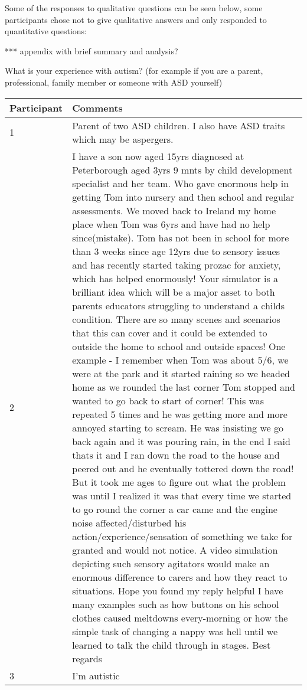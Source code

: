 Some of the responses to qualitative questions can be seen below, some participants chose not to give qualitative answers and only responded to quantitative questions:

*** appendix with brief summary and analysis?

What is your experience with autism? (for example if you are a parent, professional, family member or someone with ASD yourself)
\begin{table}[H]
    \begin{tabular}{| p{3cm} | p{12cm} |}
    \hline
     Participant & Comments \\ \hline
     1 & Parent of two ASD children. I also have ASD traits which may be aspergers. \\ \hline
     2 & I have a son now aged 15yrs diagnosed at Peterborough aged 3yrs 9 mnts by child development specialist and her team. Who gave enormous help in getting Tom into nursery and then school and regular assessments. We moved back to Ireland my home place when Tom was 6yrs and have had no help since(mistake). Tom has not been in school for more than 3 weeks since age 12yrs due to sensory issues and has recently started taking prozac for anxiety, which has helped enormously! Your simulator is a brilliant idea which will be a major asset to both parents educators struggling to understand a childs condition. There are so many scenes and scenarios that this can cover and it could be extended to outside the home to school and outside spaces! One example - I remember when Tom was about 5/6, we were at the park and it started raining so we headed home as we rounded the last corner Tom stopped and wanted to go back to start of corner! This was repeated 5 times and he was getting more and more annoyed starting to scream. He was insisting we go back again and it was pouring rain, in the end I said thats it and I ran down the road to the house and peered out and he eventually tottered down the road! But it took me ages to figure out what the problem was until I realized it was that every time we started to go round the corner a car came and the engine noise affected/disturbed his action/experience/sensation of something we take for granted and would not notice. A video simulation depicting such sensory agitators would make an enormous difference to carers and how they react to situations. Hope you found my reply helpful I have many examples such as how buttons on his school clothes caused meltdowns every-morning or how the simple task of changing a nappy was hell until we learned to talk the child through in stages. Best regards  \\ \hline
     3 &  I'm autistic  \\ \hline
    \end{tabular}
\end{table}

